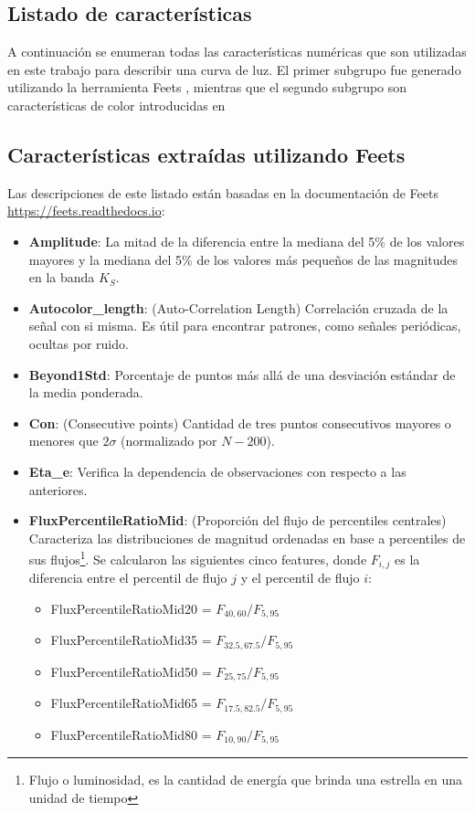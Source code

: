 \begin{appendix}
\chapter{Listado de características}\label{AnexoA}
A continuación se enumeran todas las características numéricas que son utilizadas en este trabajo para describir una curva de luz. El primer subgrupo fue generado utilizando la herramienta Feets \cite{cabral2018fats}, mientras que el segundo subgrupo son características de color introducidas en \cite{jbc}

\section{Características extraídas utilizando Feets}
Las descripciones de este listado están basadas en la documentación de Feets \url{https://feets.readthedocs.io}:

\begin{itemize}
\item \textbf{Amplitude}: La mitad de la diferencia entre la mediana del 5\% de los valores mayores y la mediana del 5\% de los valores más pequeños de las magnitudes en la banda $K_S$.

\item \textbf{Autocolor\_length}: (Auto-Correlation Length) Correlación cruzada de la señal con si misma. Es útil para encontrar patrones, como señales periódicas, ocultas por ruido.

\item \textbf{Beyond1Std}: Porcentaje de puntos más allá de una desviación estándar de la media ponderada.

\item \textbf{Con}: (Consecutive points) Cantidad de tres puntos consecutivos mayores o menores que $2\sigma$ (normalizado por  $N-200$). 

\item \textbf{Eta\_e}: Verifica la dependencia de  observaciones con respecto a las anteriores.

\item \textbf{FluxPercentileRatioMid}: (Proporción del flujo de percentiles centrales) Caracteriza las distribuciones de magnitud ordenadas en base a percentiles de sus flujos\footnote{Flujo o luminosidad, es la cantidad de energía que brinda una estrella en una unidad de tiempo}. Se calcularon las siguientes cinco features, donde $F_{i,j}$ es la diferencia entre el percentil de flujo $j$ y el percentil de flujo $i$:
	\begin{itemize}
	\item FluxPercentileRatioMid20 = $F_{40,60} / F_{5,95}$
	\item FluxPercentileRatioMid35 = $F_{32.5,67.5} / F_{5,95}$
	\item FluxPercentileRatioMid50 = $F_{25,75} / F_{5,95}$
	\item FluxPercentileRatioMid65 = $F_{17.5,82.5} / F_{5,95}$
	\item FluxPercentileRatioMid80 = $F_{10,90} / F_{5,95}$
	\end{itemize}


\end{itemize}
\end{appendix}
